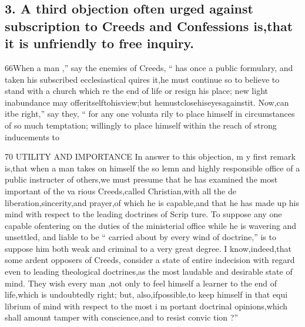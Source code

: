 \documentclass[
]{book}
\begin{document}
\hypertarget{a-third-objection-often-urged-against-subscription-to-creeds-and-confessions-isthat-it-is-unfriendly-to-free-inquiry.}{%
\subsection{3. A third objection often urged against subscription to Creeds and Confessions is,that it is unfriendly to free inquiry.}\label{a-third-objection-often-urged-against-subscription-to-creeds-and-confessions-isthat-it-is-unfriendly-to-free-inquiry.}}

66When a man ,'' say the enemies of Creeds, `` has once
a public formulary, and taken his
subscribed
ecclesiastical
quires it,he must continue so to believe to
stand with a church which re
the end of life or resign his place; new light inabundance may offeritselftohisview;but hemustclosehiseyesagainstit. Now,can
itbe right,'' say they, `` for any one volunta
rily to place himself in circumstances
of so
much temptation; willingly to place himself within the reach of strong inducements to

70 UTILITY AND IMPORTANCE
In answer to this objection, m y first remark
is,that when a man takes on himself the so
lemn and highly responsible office of a public
instructer of others,we must presume that he
has examined the most important of the va
rious Creeds,called Christian,with all the de
liberation,sincerity,and prayer,of which he
is capable,and that he has made up his mind
with respect to the leading doctrines of Scrip
ture. To suppose any one capable ofentering on the duties of the ministerial office while he
is wavering and unsettled, and liable to be
`` carried about by every wind of doctrine,'' is to suppose him both weak and criminal to a
very great degree. I know,indeed,that some ardent opposers of Creeds, consider a state of entire indecision with regard even to leading theological doctrines,as the most laudable and desirable state of mind. They wish every man ,not only to feel himself a learner to the end of life,which is undoubtedly right; but,
also,ifpossible,to keep himself in that equi librium of mind with respect to the most i m
portant doctrinal opinions,which shall amount
tamper with conscience,and to resist convic tion ?''
\end{document}
